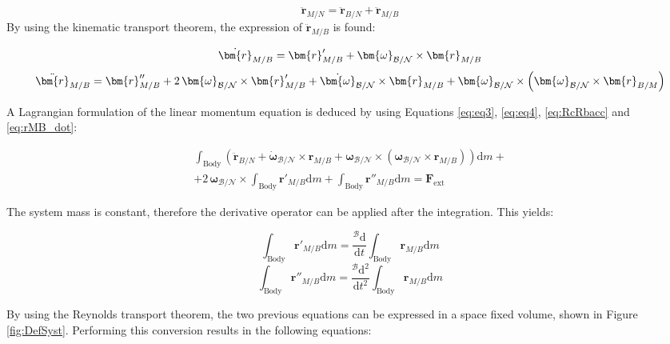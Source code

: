 \begin{equation}\label{eq:RcRbacc}
	\ddot{\bm{r}}_{M/N} = \ddot{\bm{r}}_{B/N} + \ddot{\bm{r}}_{M/B}
\end{equation}
By using the kinematic transport theorem, the expression of $\ddot{\bm{r}}_{M/B}$ is found:

\begin{equation}\label{eq:rMB_ddot}
	\dot{\bm{r}}_{M/B} = \bm{r}'_{M/B} + \bm{\omega}_{\cal{B}/\cal{N}}\times\bm{r}_{M/B}
\end{equation}
\begin{equation}\label{eq:rMB_dot}
	\ddot{\bm{r}}_{M/B} = \bm{r}''_{M/B}+2\,\bm{\omega}_{\cal{B}/\cal{N}}\times
	\bm{r}'_{M/B} + \dot{\bm{\omega}}_{\cal{B}/\cal{N}}\times \bm{r}_{M/B} + \bm{\omega}_{\cal{B}/\cal{N}}\times\left(\bm{\omega}_{\cal{B}/\cal{N}} \times \bm{r}_{B/M} \right)
\end{equation}

A Lagrangian formulation of the linear momentum equation is deduced by using Equations \eqref{eq:eq3}, \eqref{eq:eq4}, \eqref{eq:RcRbacc} and \eqref{eq:rMB_dot}:

\begin{multline}\label{eq:eq11}
	\int_{\text{Body}}\left(\ddot{\bm{r}}_{B/N} + \dot{\bm{\omega}}_{\mathcal{B}/\mathcal{N}}\times\bm{r}_{M/B} + \bm{\omega}_{\mathcal{B}/\mathcal{N}} \times\left(\bm{\omega}_{\mathcal{B}/\mathcal{N}} \times\bm{r}_{M/B}\right)\right)\text{d}m +\\+
	2\,\bm{\omega}_{\mathcal{B}/\mathcal{N}}\times\int_{\text{Body}}\bm{r}'_{M/B}\text{d}m + \int_{\text{Body}}\bm{r}''_{M/B}\text{d}m = \bm{F}_{\text{ext}}
\end{multline}

The system mass is constant, therefore the derivative operator can be applied after the integration. This yields:

\begin{equation}
	\int_{\text{Body}}\bm{r}'_{M/B}\text{d}m = \frac{^{\mathcal{B}}\text{d}}{\text{d}t}\int_{\text{Body}}\bm{r}_{M/B}\text{d}m
\end{equation}
\begin{equation}
	\int_{\text{Body}}\bm{r}''_{M/B}\text{d}m = \frac{^{\mathcal{B}}\text{d}^2}{\text{d}t^2}\int_{\text{Body}}\bm{r}_{M/B}\text{d}m
\end{equation}

By using the Reynolds transport theorem, the two previous equations can be expressed in a space fixed volume, shown in Figure \ref{fig:DefSyst}. Performing this conversion results in the following equations:

